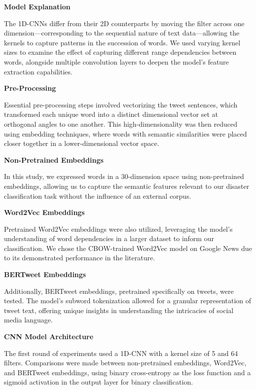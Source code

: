 \documentclass[10pt,table]{article}
\begin{document}
\textbf{Model Explanation}

The 1D-CNNs differ from their 2D counterparts by moving the filter across one dimension—corresponding to the sequential nature of text data—allowing the kernels to capture patterns in the succession of words. We used varying kernel sizes to examine the effect of capturing different range dependencies between words, alongside multiple convolution layers to deepen the model's feature extraction capabilities.


\textbf{Pre-Processing}

Essential pre-processing steps involved vectorizing the tweet sentences, which transformed each unique word into a distinct dimensional vector set at orthogonal angles to one another. This high-dimensionality was then reduced using embedding techniques, where words with semantic similarities were placed closer together in a lower-dimensional vector space.


\textbf{Non-Pretrained Embeddings}

In this study, we expressed words in a 30-dimension space using non-pretrained embeddings, allowing us to capture the semantic features relevant to our disaster classification task without the influence of an external corpus.


\textbf{Word2Vec Embeddings}

Pretrained Word2Vec embeddings were also utilized, leveraging the model's understanding of word dependencies in a larger dataset to inform our classification. We chose the CBOW-trained Word2Vec model on Google News due to its demonstrated performance in the literature.


\textbf{BERTweet Embeddings}

Additionally, BERTweet embeddings, pretrained specifically on tweets, were tested. The model's subword tokenization allowed for a granular representation of tweet text, offering unique insights in understanding the intricacies of social media language.


\textbf{CNN Model Architecture}

The first round of experiments used a 1D-CNN with a kernel size of 5 and 64 filters. Comparisons were made between non-pretrained embeddings, Word2Vec, and BERTweet embeddings, using binary cross-entropy as the loss function and a sigmoid activation in the output layer for binary classification.
\end{document}

